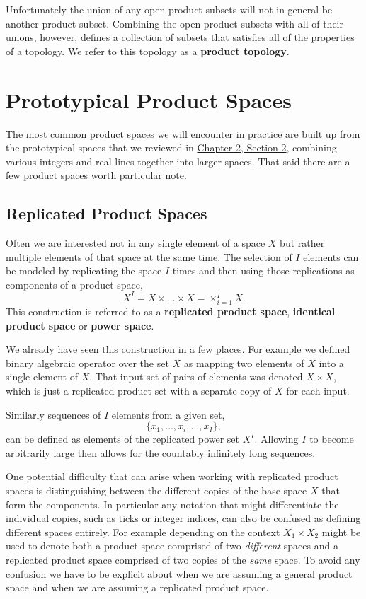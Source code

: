 \documentclass[
  letterpaper,
  DIV=11,
  numbers=noendperiod]{scrartcl}
\begin{document}
Unfortunately the union of any open product subsets will not in general
be another product subset. Combining the open product subsets with all
of their unions, however, defines a collection of subsets that satisfies
all of the properties of a topology. We refer to this topology as a
\textbf{product topology}.

\hypertarget{prototypical-product-spaces}{%
\section{Prototypical Product
Spaces}\label{prototypical-product-spaces}}

The most common product spaces we will encounter in practice are built
up from the prototypical spaces that we reviewed in
\href{@sec:proto-spaces}{Chapter 2, Section 2}, combining various
integers and real lines together into larger spaces. That said there are
a few product spaces worth particular note.

\hypertarget{replicated-product-spaces}{%
\subsection{Replicated Product Spaces}\label{replicated-product-spaces}}

Often we are interested not in any single element of a space \(X\) but
rather multiple elements of that space at the same time. The selection
of \(I\) elements can be modeled by replicating the space \(I\) times
and then using those replications as components of a product space, \[
X^{I} = X \times \ldots \times X = \times_{i = 1}^{I} X.
\] This construction is referred to as a \textbf{replicated product
space}, \textbf{identical product space} or \textbf{power space}.

We already have seen this construction in a few places. For example we
defined binary algebraic operator over the set \(X\) as mapping two
elements of \(X\) into a single element of \(X\). That input set of
pairs of elements was denoted \(X \times X\), which is just a replicated
product set with a separate copy of \(X\) for each input.

Similarly sequences of \(I\) elements from a given set, \[
\{ x_{1}, \ldots, x_{i}, \ldots, x_{I} \},
\] can be defined as elements of the replicated power set \(X^{I}\).
Allowing \(I\) to become arbitrarily large then allows for the countably
infinitely long sequences.

One potential difficulty that can arise when working with replicated
product spaces is distinguishing between the different copies of the
base space \(X\) that form the components. In particular any notation
that might differentiate the individual copies, such as ticks or integer
indices, can also be confused as defining different spaces entirely. For
example depending on the context \(X_{1} \times X_{2}\) might be used to
denote both a product space comprised of two \emph{different} spaces and
a replicated product space comprised of two copies of the \emph{same}
space. To avoid any confusion we have to be explicit about when we are
assuming a general product space and when we are assuming a replicated
product space.
\end{document}
